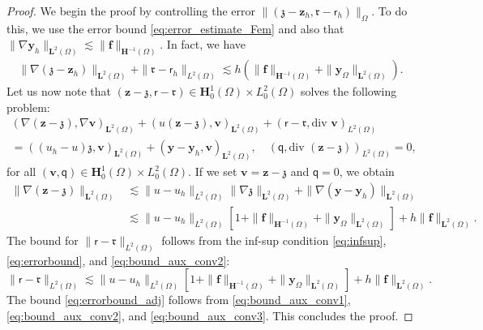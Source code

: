 \documentclass[final]{siamart0216}
\begin{document}
\begin{proof}
We begin the proof by controlling the error $\| (\boldsymbol{\mathfrak{z}} - \mathbf{z}_{h}, \mathfrak{r}-\mathsf{r}_{h}) \|_{\Omega}$. To do this, we use the error bound \eqref{eq:error_estimate_Fem} and also that $\| \nabla \mathbf{y}_{h}\|_{\mathbf{L}^2(\Omega)} \lesssim \| \mathbf{f} \|_{ \mathbf{H}^{-1}(\Omega) }$.
In fact, we have
\begin{align}\label{eq:bound_aux_conv1}
\|\nabla(\boldsymbol{\mathfrak{z}}-\mathbf{z}_{h})\|_{\mathbf{L}^2(\Omega)}+\|\mathfrak{r}-\mathsf{r}_{h}\|_{L^2(\Omega)}
\lesssim 
h( \| \mathbf{f} \|_{ \mathbf{H}^{-1}(\Omega)} + \|\mathbf{y}_{\Omega}\|_{\mathbf{L}^2(\Omega)}).
\end{align}
Let us now note that $(\mathbf{z}- \boldsymbol{\mathfrak{z}},\mathsf{r}-\mathfrak{r})\in\mathbf{H}_0^1(\Omega)\times L_0^2(\Omega)$ solves the following problem:
\begin{multline*}
(\nabla (\mathbf{z}- \boldsymbol{\mathfrak{z}}),\nabla \mathbf{v})_{\mathbf{L}^2(\Omega)}+( u(\mathbf{z}- \boldsymbol{\mathfrak{z}}), \mathbf{v})_{\mathbf{L}^2(\Omega)}+(\mathsf{r}-\mathfrak{r},\text{div }\mathbf{v})_{L^2(\Omega)} \\=((u_{h}-u)\boldsymbol{\mathfrak{z}},\mathbf{v})_{\mathbf{L}^2(\Omega)}+(\mathbf{y}-\mathbf{y}_{h},\mathbf{v})_{\mathbf{L}^2(\Omega)},\quad (\mathsf{q},\text{div }(\mathbf{z}- \boldsymbol{\mathfrak{z}}))_{L^2(\Omega)}  =  0,
\end{multline*}
for all $(\mathbf{v},\mathsf{q}) \in \mathbf{H}_0^1(\Omega) \times L_0^2(\Omega)$. If we set $\mathbf{v} = \mathbf{z}- \boldsymbol{\mathfrak{z}}$ and $\mathsf{q}=0$, we obtain
\begin{equation}
\label{eq:bound_aux_conv2}
\begin{aligned}
\|\nabla(\mathbf{z}- \boldsymbol{\mathfrak{z}})\|_{\mathbf{L}^2(\Omega)}
& \lesssim  \|u-u_{h}\|_{L^2(\Omega)}\|\nabla\boldsymbol{\mathfrak{z}}\|_{\mathbf{L}^{2}(\Omega)}+\|\nabla (\mathbf{y}-\mathbf{y}_{h})\|_{\mathbf{L}^2(\Omega)}\\
& \lesssim  \|u-u_{h}\|_{L^2(\Omega)}[ 1 + \|\mathbf{f}\|_{\mathbf{H}^{-1}(\Omega)} +\|\mathbf{y}_{\Omega}\|_{\mathbf{L}^2(\Omega)}] +h\|\mathbf{f}\|_{\mathbf{L}^2(\Omega)}.
 \end{aligned}
\end{equation}
The bound for $\|\mathsf{r}-\mathfrak{r}\|_{L^2(\Omega)}$ follows from the inf-sup condition \eqref{eq:infsup}, \eqref{eq:errorbound}, and \eqref{eq:bound_aux_conv2}:
\begin{equation}\label{eq:bound_aux_conv3}
\|\mathsf{r}-\mathfrak{r}\|_{L^2(\Omega)}\lesssim 
\|u-u_{h}\|_{L^2(\Omega)}[ 1 + \|\mathbf{f}\|_{\mathbf{H}^{-1}(\Omega)} +\|\mathbf{y}_{\Omega}\|_{\mathbf{L}^2(\Omega)}] +h\|\mathbf{f}\|_{\mathbf{L}^2(\Omega)}.\end{equation}
The bound \eqref{eq:errorbound_adj} follows from \eqref{eq:bound_aux_conv1}, \eqref{eq:bound_aux_conv2}, and \eqref{eq:bound_aux_conv3}. This concludes the proof.
\end{proof}
\end{document}
